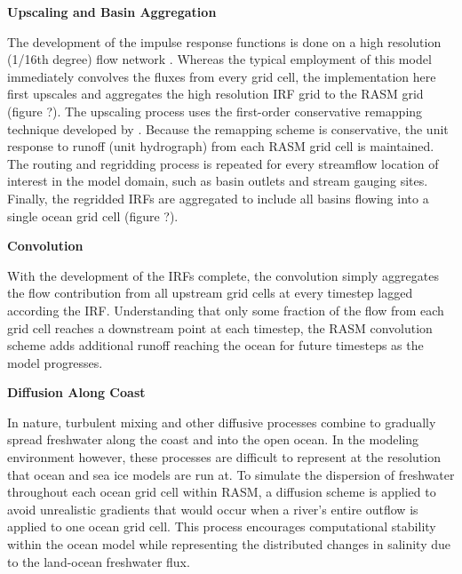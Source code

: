 \textbf{Upscaling and Basin Aggregation}

The development of the impulse response functions is done on a high resolution (1/16th degree) flow network \cite{Wu_2011}.
Whereas the typical employment of this model immediately convolves the fluxes from every grid cell, the implementation here first upscales and aggregates the high resolution IRF grid to the RASM grid (figure ?).
The upscaling process uses the first-order conservative remapping technique developed by \cite{Jones_1999}.
Because the remapping scheme is conservative, the unit response to runoff (unit hydrograph) from each RASM grid cell is maintained.
The routing and regridding process is repeated for every streamflow location of interest in the model domain, such as basin outlets and stream gauging sites.
Finally, the regridded IRFs are aggregated to include all basins flowing into a single ocean grid cell (figure ?).

\textbf{Convolution}

With the development of the IRFs complete, the convolution simply aggregates the flow contribution from all upstream grid cells at every timestep lagged according the IRF.
Understanding that only some fraction of the flow from each grid cell reaches a downstream point at each timestep, the RASM convolution scheme adds additional runoff reaching the ocean for future timesteps as the model progresses.

\textbf{Diffusion Along Coast}

In nature, turbulent mixing and other diffusive processes combine to gradually spread freshwater along the coast and into the open ocean.
In the modeling environment however, these processes are difficult to represent at the resolution that ocean and sea ice models are run at.
To simulate the dispersion of freshwater throughout each ocean grid cell within RASM, a diffusion scheme is applied to avoid unrealistic gradients that would occur when a river’s entire outflow is applied to one ocean grid cell.
This process encourages computational stability within the ocean model while representing the distributed changes in salinity due to the land-ocean freshwater flux.
